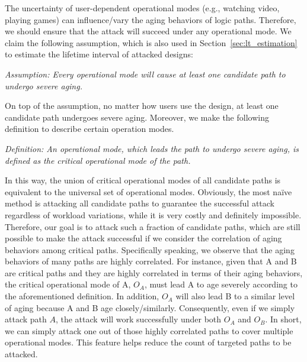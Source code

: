 The uncertainty of user-dependent operational modes (e.g., watching video, playing games) can influence/vary the aging behaviors of logic paths. Therefore, we should ensure that the attack will succeed under any operational mode. We claim the following assumption, which is also used in Section~\ref{sec:lt_estimation} to estimate the lifetime interval of attacked designs:

{\setlength{\parskip}{3pt}
\noindent \textit{Assumption: Every operational mode will cause at least one candidate path to undergo severe aging.}

On top of the assumption, no matter how users use the design, at least one candidate path undergoes severe aging. Moreover, we make the following definition to describe certain operation modes.

\noindent \textit{Definition: An operational mode, which leads the path to undergo severe aging, is defined as the critical operational mode of the path.}
}

In this way, the union of critical operational modes of all candidate paths is equivalent to the universal set of operational modes. Obviously, the most na\"ive method is attacking all candidate paths to guarantee the successful attack regardless of workload variations, while it is very costly and definitely impossible. Therefore, our goal is to attack such a fraction of candidate paths, which are still possible to make the attack successful if we consider the correlation of aging behaviors among critical paths. Specifically speaking, we observe that the aging behaviors of many paths are highly correlated. For instance, given that A and B are critical paths and they are highly correlated in terms of their aging behaviors, the critical operational mode of A, $O_{A}$, must lead A to age severely according to the aforementioned definition. In addition, $O_{A}$ will also lead B to a similar level of aging because A and B age closely/similarly. Consequently, even if we simply attack path $A$, the attack will work successfully under both $O_{A}$ and $O_{B}$. In short, we can simply attack one out of those highly correlated paths to cover multiple operational modes. This feature helps reduce the count of targeted paths to be attacked.%

